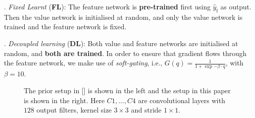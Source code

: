 . \emph{Fixed Learnt} (\textbf{FL}): The feature network is \textbf{pre-trained} first using $\hat{y}_{\text{f}}$ as output. Then the value network is initialised at random, and only the value network is trained and the feature network is fixed.

. \emph{Decoupled learning} (\textbf{DL}): Both value and feature networks are initialised at random, and \textbf{both are trained}. In order to ensure that gradient flows through the feature network, we make use of \emph{soft-gating}, i.e., $G(q)=\frac{1}{1+\exp{-\beta\cdot q}}$, with $\beta=10$. 

\begin{figure}[h]
\centering
\begin{minipage}{0.49\columnwidth}
\centering
{}
\end{minipage}
\begin{minipage}{0.49\columnwidth}
\centering
{}
\end{minipage}
\caption{The prior setup in [] is shown in the left and the setup in this paper is shown in the right. Here $C1,\ldots,C4$ are convolutional layers with $128$ output filters, kernel size $3\times 3$ and stride $1\times 1$.}
\label{fig:dgn-prior-new}
\end{figure}

